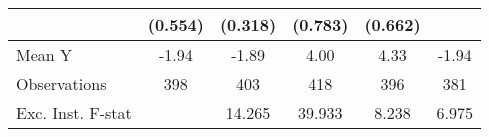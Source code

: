 {\begin{tabular}{l*{5}{c}}
            &     (0.554)         &     (0.318)         &     (0.783)         &     (0.662)         &                     \\
\midrule
Mean Y      &       -1.94         &       -1.89         &        4.00         &        4.33         &       -1.94         \\
Observations&         398         &         403         &         418         &         396         &         381         \\
Exc. Inst. F-stat&                     &      14.265         &      39.933         &       8.238         &       6.975         \\
\bottomrule
\end{tabular}
}
